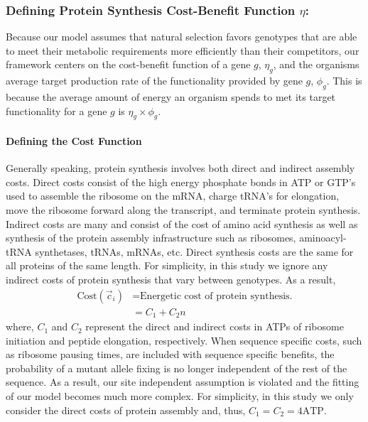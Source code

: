 \documentclass{article}
\newcommand{\cvec}{\ensuremath{\Vec{c}}\xspace}
\newcommand{\cveci}{\ensuremath{\cvec_i}\xspace}
\newcommand{\phig}{\ensuremath{\phi_{g}}\xspace}
\newcommand{\Costcveci}{\ensuremath{\text{Cost}(\cveci)}\xspace}
\begin{document}
\subsubsection*{Defining Protein Synthesis Cost-Benefit Function $\eta$: }
Because our model assumes that natural selection favors genotypes that are able to meet their metabolic requirements more efficiently than their competitors, our framework centers on the cost-benefit function of a gene $g$, $\eta_g$, and the organisms average target production rate of the functionality provided by gene $g$, $\phig$.
This is because the average amount of energy an organism spends to met its target functionality for a gene $g$ is $\eta_g \times \phig$.
 
\paragraph*{Defining the Cost Function}
Generally speaking, protein synthesis involves both direct and indirect assembly costs.
Direct costs consist of the high energy phosphate bonds in ATP or GTP's used to assemble the ribosome on the mRNA, charge tRNA's for elongation, move the ribosome forward along the transcript, and terminate protein synthesis.
Indirect costs are many and consist of the cost of amino acid synthesis as well as synthesis of the protein assembly infrastructure such as ribosomes, aminoacyl-tRNA synthetases, tRNAs, mRNAs, etc.
Direct synthesis costs are the same for all proteins of the same length.
For simplicity, in this study we ignore any indirect costs of protein synthesis that vary between genotypes.
As a result, 
\begin{align}
\label{eq:defineCost}
  \Costcveci  &= \text{Energetic cost of protein synthesis.}\\
  &= C_1 + C_2 n
\end{align}
where, $C_1$ and $C_2$ represent the direct and indirect costs in ATPs of ribosome initiation and peptide elongation, respectively.
When sequence specific costs, such as ribosome pausing times, are included with sequence specific benefits, the probability of a mutant allele fixing is no longer independent of the rest of the sequence.
As a result, our site independent assumption is violated and the fitting of our model becomes much more complex.
For simplicity, in this study we only consider the direct costs of protein assembly and, thus, $C_1 = C_2 = 4 \text{ATP}$.
 
\end{document}
